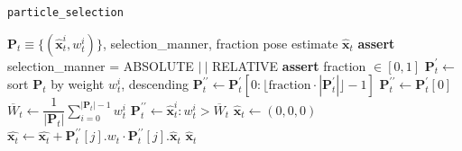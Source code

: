 \begin{algorithm}
  \caption{\texttt{particle\_selection}}
  \begin{spacing}{1.2}
  \begin{algorithmic}[1]
    \REQUIRE $\bm{P}_t \equiv \{(\hat{\bm{x}}_t^i, w_t^i)\}$, selection\_manner, fraction
    \ENSURE pose estimate $\hat{\bm{x}}_t$
    \STATE \textbf{assert} selection\_manner = ABSOLUTE $|\ |$ RELATIVE
    \STATE \textbf{assert} fraction $\in [0,1]$
      \STATE $\bm{P}_t^\prime \leftarrow $ sort $\bm{P}_t$ by weight $w_t^i$, descending
        \STATE $\bm{P}_t^{\prime\prime} \leftarrow \bm{P}_t^\prime[0: \lfloor\text{fraction}\cdot|\bm{P}_t^\prime| \rfloor - 1]$
      \ELSE
        \STATE $\bm{P}_t^{\prime\prime} \leftarrow \bm{P}_t^\prime[0]$
      \ENDIF
    \ENDIF
      \STATE $\overline{W}_t \leftarrow \dfrac{1}{|\bm{P}_t|}\sum\limits_{i=0}^{|\bm{P}_t|-1} w_t^i$
      \STATE $\bm{P}_t^{\prime\prime} \leftarrow \hat{\bm{x}}_t^i : w_t^i > \overline{W}_t$
    \ENDIF
    \STATE $\hat{\bm{x}}_t \leftarrow (0,0,0)$
      \STATE $\hat{\bm{x}_t} \leftarrow \hat{\bm{x}_t} + \bm{P}_t^{\prime\prime}[j].w_t \cdot \bm{P}_t^{\prime\prime}[j].\hat{\bm{x}}_t$
    \ENDFOR
    \RETURN $\hat{\bm{x}}_t$
  \end{algorithmic}
  \end{spacing}
  \label{alg:particle_selection}
\end{algorithm}

